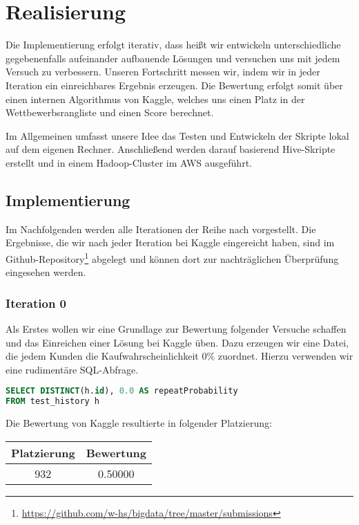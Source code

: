 \section{Realisierung}

Die Implementierung erfolgt iterativ, dass heißt wir entwickeln unterschiedliche gegebenenfalls aufeinander aufbauende Lösungen
und versuchen uns mit jedem Versuch zu verbessern. Unseren Fortschritt messen wir, indem wir in jeder Iteration ein einreichbares Ergebnis erzeugen. Die Bewertung erfolgt somit über einen internen Algorithmus von Kaggle, welches uns einen Platz in der Wettbewerbsrangliste und einen Score berechnet.

Im Allgemeinen umfasst unsere Idee das Testen und Entwickeln der Skripte lokal auf dem eigenen Rechner. Anschließend werden darauf basierend Hive-Skripte erstellt und in einem Hadoop-Cluster im AWS ausgeführt.

\subsection{Implementierung}
Im Nachfolgenden werden alle Iterationen der Reihe nach vorgestellt. Die Ergebnisse, die wir nach jeder Iteration bei Kaggle eingereicht haben, sind im Github-Repository\footnote{\url{https://github.com/w-hs/bigdata/tree/master/submissions}} abgelegt und können dort zur nachträglichen Überprüfung eingesehen werden.

\subsubsection{Iteration 0}
\label{sec:iteration0}

Als Erstes wollen wir eine Grundlage zur Bewertung folgender Versuche schaffen und das Einreichen einer
Lösung bei Kaggle üben. Dazu erzeugen wir eine Datei, die jedem Kunden die Kaufwahrscheinlichkeit 0\%
zuordnet. Hierzu verwenden wir eine rudimentäre SQL-Abfrage.

\begin{lstlisting}[language=SQL]
SELECT DISTINCT(h.id), 0.0 AS repeatProbability 
FROM test_history h
\end{lstlisting}

Die Bewertung von Kaggle resultierte in folgender Platzierung:

\begin{tabular}{|c|c|}
	\hline \textbf{Platzierung} & \textbf{Bewertung} \\ 
	\hline 932 & 0.50000  \\ 
	\hline 
\end{tabular}

